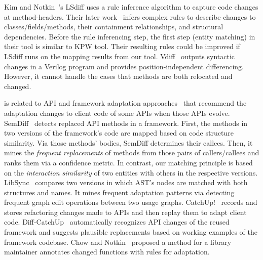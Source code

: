 Kim and Notkin~\cite{Kim07}'s LSdiff uses a rule inference algorithm
to capture code changes at method-headers. Their later
work~\cite{Kim09} infers complex rules to describe changes to
classes/fields/methods, their containment relationships, and
structural dependencies. Before the rule inferencing step, the first
step (entity matching) in their tool is similar to KPW tool. Their
resulting rules could be improved if LSdiff runs on the mapping
results from our tool. Vdiff~\cite{kim10} outputs syntactic changes in
a Verilog program and provides position-independent differencing.
However, it cannot handle the cases that methods are both relocated
and changed.



\vspace{0.05in}
 {\tool} is related to
API and framework adaptation approaches~\cite{semdiff08,catchup05}
that recommend the adaptation changes to client code of some APIs when
those APIs evolve. SemDiff~\cite{semdiff08} detects replaced API
methods in a framework. First, the methods in two versions of the
framework's code are mapped based on code structure similarity. Via
those methods' bodies, SemDiff determines their callees. Then, it
mines the {\em frequent replacements} of methods from those pairs of
callers/callees and ranks them via a confidence metric. In contrast,
our matching principle is based on the {\em interaction similarity} of
two entities with others in the respective
versions. LibSync~\cite{oopsla10} compares two versions in which AST's
nodes are matched with both structures and names. It mines frequent
adaptation patterns via detecting frequent graph edit operations
between two usage graphs. CatchUp!~\cite{catchup05} records and stores
refactoring changes made to APIs and then replay them to adapt client
code. Diff-CatchUp~\cite{Xing2007:diffcatchup} automatically
recognizes API changes of the reused framework and suggests plausible
replacements based on working examples of the framework codebase.
Chow and Notkin~\cite{Chow1996} proposed a method for a library
maintainer annotates changed functions with rules for adaptation.





